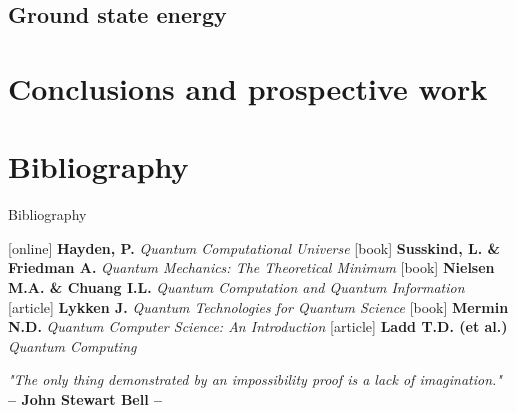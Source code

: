 \documentclass[9pt, handout, aspectratio=169]{beamer}	%
\begin{document}
\subsection{Ground state energy}



\section{Conclusions and prospective work}



\section{Bibliography}
\begin{frame}{Bibliography}

	\begin{thebibliography}{9}
		[online]
	 \textbf{Hayden, P.} \emph{Quantum Computational Universe}
	 \textbf{Susskind, L. \& Friedman A.} \emph{Quantum Mechanics: The Theoretical Minimum}
	 \textbf{Nielsen M.A. \& Chuang I.L.} \emph{Quantum Computation and Quantum Information}
		[article]
	 \textbf{Lykken J.} \emph{Quantum Technologies for Quantum Science}
	 \textbf{Mermin N.D.} \emph{Quantum Computer Science: An Introduction}
		[article]
	 \textbf{Ladd T.D. (et al.)} \emph{Quantum Computing}

	\end{thebibliography}

	\vspace{20pt}
	\begin{small}
	\begin{center}{
	\color{gray}
		\emph{"The only thing demonstrated by an impossibility proof is a lack of imagination."} \\
		\textbf{– John Stewart Bell –} }
	\end{center}
	\end{small}
\end{frame}

\FinalFrame
\end{document}
